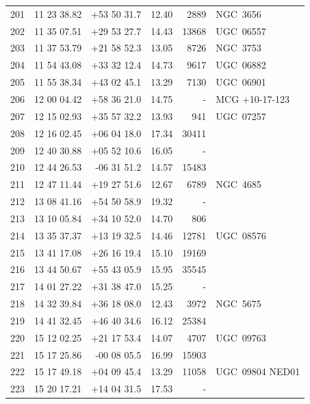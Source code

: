 \documentclass[useAMS,usenatbib]{mn2e}
\begin{document}
\begin{table}
\begin{tabular}{rrrlrl}
 201 &  11 23 38.82 & +53 50 31.7 &  12.40 &   2889 &         NGC~3656 \\
 202 &  11 35 07.51 & +29 53 27.7 &  14.43 &  13868 &        UGC~06557 \\
 203 &  11 37 53.79 & +21 58 52.3 &  13.05 &   8726 &         NGC~3753 \\
 204 &  11 54 43.08 & +33 32 12.4 &  14.73 &   9617 &        UGC~06882 \\
 205 &  11 55 38.34 & +43 02 45.1 &  13.29 &   7130 &        UGC~06901 \\
 206 &  12 00 04.42 & +58 36 21.0 &  14.75 &      - &   MCG +10-17-123 \\
 207 &  12 15 02.93 & +35 57 32.2 &  13.93 &    941 &        UGC~07257 \\
 208 &  12 16 02.45 & +06 04 18.0 &  17.34 &  30411 &                  \\
 209 &  12 40 30.88 & +05 52 10.6 &  16.05 &     -  &                  \\
 210 &  12 44 26.53 & -06 31 51.2 &  14.57 &  15483 &                  \\
 211 &  12 47 11.44 & +19 27 51.6 &  12.67 &   6789 &         NGC~4685 \\
 212 &  13 08 41.16 & +54 50 58.9 &  19.32 &      - &                  \\
 213 &  13 10 05.84 & +34 10 52.0 &  14.70 &    806 &                  \\
 214 &  13 35 37.37 & +13 19 32.5 &  14.46 &  12781 &        UGC~08576 \\
 215 &  13 41 17.08 & +26 16 19.4 &  15.10 &  19169 &                  \\
 216 &  13 44 50.67 & +55 43 05.9 &  15.95 &  35545 &                  \\
 217 &  14 01 27.22 & +31 38 47.0 &  15.25 &      - &                  \\
 218 &  14 32 39.84 & +36 18 08.0 &  12.43 &   3972 &         NGC~5675 \\
 219 &  14 41 32.45 & +46 40 34.6 &  16.12 &  25384 &                  \\
 220 &  15 12 02.25 & +21 17 53.4 &  14.07 &   4707 &        UGC~09763 \\
 221 &  15 17 25.86 & -00 08 05.5 &  16.99 &  15903 &                  \\
 222 &  15 17 49.18 & +04 09 45.4 &  13.29 &  11058 &  UGC~09804 NED01 \\
 223 &  15 20 17.21 & +14 04 31.5 &  17.53 &      - &                  \\

\end{tabular}
\end{table}
\end{document}
